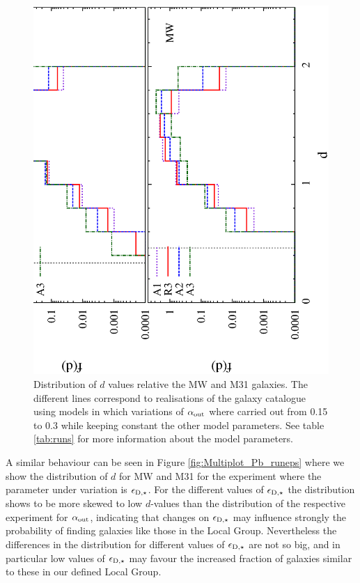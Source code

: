 \documentclass[useAMS,usenatbib]{mn2e}
\begin{document}
\begin{figure}
 \includegraphics[scale=0.33,angle=270]{figures/Multiplot_Pb_runalpha.ps}
 \caption{Distribution of $d$ values relative the MW and M31
   galaxies. The different lines correspond to realisations of the
   galaxy catalogue using models in which variations of $\alpha_{\rm
     out}$ where carried out from 0.15 to 0.3 while keeping constant
   the other model parameters. See table \ref{tab:runs} for more
   information about the model parameters.}
 \label{fig:Multiplot_Pb_runalpha}
\end{figure}


A similar behaviour can be seen in Figure
\ref{fig:Multiplot_Pb_runeps} where we show the distribution of $d$
for MW and M31 for the experiment where the parameter under variation
is $\epsilon_{{\rm D},\star}$. For the different values of
$\epsilon_{{\rm D},\star}$ the distribution shows to be more skewed to
low $d$-values than the distribution of the respective experiment for
$\alpha_{\rm out}$, indicating that changes on $\epsilon_{{\rm
    D},\star}$ may influence strongly the probability of finding
galaxies like those in the Local Group. Nevertheless the differences
in the distribution for different values of $\epsilon_{{\rm D},\star}$
are not so big, and in particular low values of $\epsilon_{{\rm
    D},\star}$ may favour the increased fraction of galaxies similar
to these in our defined Local Group.
\end{document}
